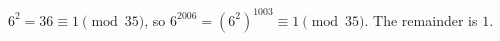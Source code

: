 \(6^2=36\equiv 1\pmod{35}\), so \(6^{2006}=(6^2)^{1003}\equiv 1\pmod{35}\). The remainder is \(\boxed{1}\).
